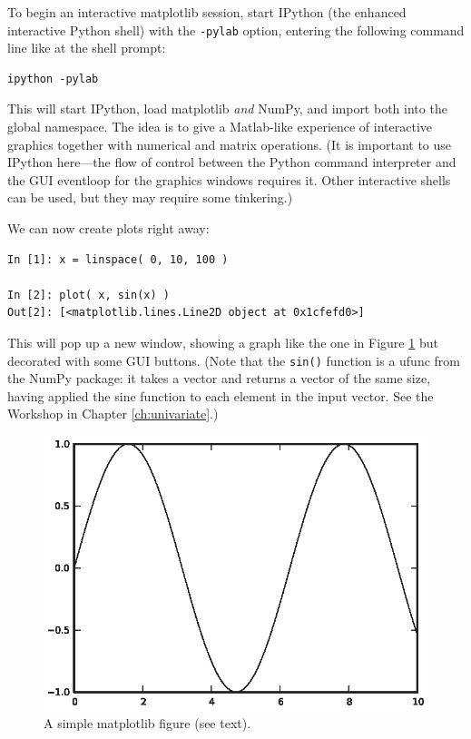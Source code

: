  
To begin an interactive matplotlib session, start IPython (the enhanced
interactive Python shell) with the \texttt{-pylab} option, entering
the following command line like at the shell prompt:

\begin{verbatim}
ipython -pylab  
\end{verbatim}

This will start IPython, load matplotlib \emph{and} NumPy, and import
both into the global namespace. The idea is to give a Matlab-like
experience of interactive graphics together with numerical and matrix
operations.  (It is important to use IPython here---the flow of
control between the Python command interpreter and the GUI eventloop
for the graphics windows requires it. Other interactive shells can be
used, but they may require some tinkering.)

We can now create plots right away:

\begin{verbatim}
In [1]: x = linspace( 0, 10, 100 )

In [2]: plot( x, sin(x) )
Out[2]: [<matplotlib.lines.Line2D object at 0x1cfefd0>]
\end{verbatim}

This will pop up a new window, showing a graph like the one in Figure
\ref{fig:mplt1} but decorated with some GUI buttons. (Note that the
\texttt{sin()} function is a ufunc from the NumPy package: it takes a
vector and returns a vector of the same size, having applied the sine
function to each element in the input vector. See the Workshop in
Chapter \ref{ch:univariate}.)

\begin{figure}
  \centerline{ \includegraphics{img/mplt1}}
  \caption{A simple matplotlib figure (see text).}
  \label{fig:mplt1}
\end{figure}

